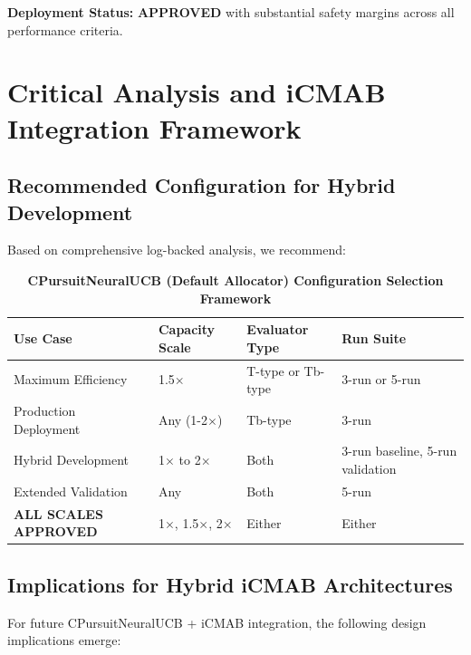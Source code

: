 \documentclass[12pt,a4paper]{article}
\newcommand{\success}[1]{\textcolor{successcolor}{\textbf{#1}}}
\begin{document}
\textbf{Deployment Status:} \success{\textbf{APPROVED}} with substantial safety margins across all performance criteria.

\section{Critical Analysis and iCMAB Integration Framework}

\subsection{Recommended Configuration for Hybrid Development}

Based on comprehensive log-backed analysis, we recommend:

\begin{table}[H]
\centering
\caption{\success{CPursuitNeuralUCB (Default Allocator) Configuration Selection Framework}}
\begin{tabular}{|l|l|l|l|}
\hline
\textbf{Use Case} & \textbf{Capacity Scale} & \textbf{Evaluator Type} & \textbf{Run Suite} \\
\hline
Maximum Efficiency      & 1.5$\times$     & T-type or Tb-type & 3-run or 5-run \\
Production Deployment   & Any (1-2$\times$) & Tb-type           & 3-run \\
Hybrid Development      & 1$\times$ to 2$\times$ & Both      & 3-run baseline, 5-run validation \\
Extended Validation     & Any             & Both              & 5-run \\
\success{ALL SCALES APPROVED} & 1$\times$, 1.5$\times$, 2$\times$ & Either & Either \\
\hline
\end{tabular}
\end{table}

\subsection{Implications for Hybrid iCMAB Architectures}

For future CPursuitNeuralUCB + iCMAB integration, the following design implications emerge:
\end{document}
